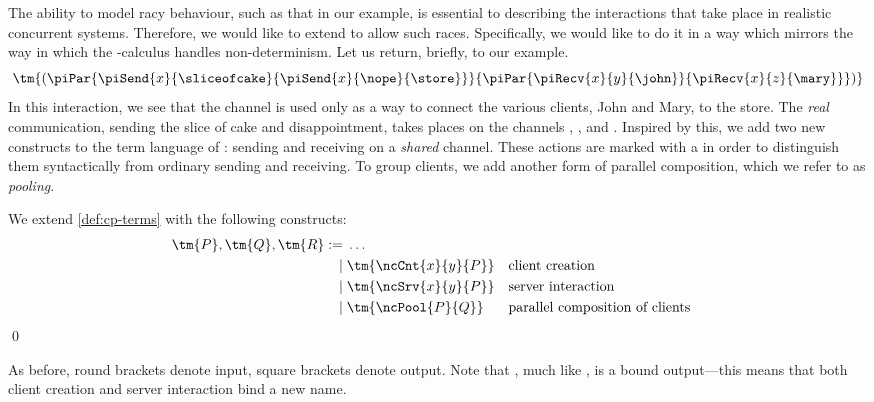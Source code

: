 \documentclass[UKenglish]{llncs}
\begin{document}
The ability to model racy behaviour, such as that in our example, is essential
to describing the interactions that take place in realistic concurrent systems.
Therefore, we would like to extend \cp to allow such races.
Specifically, we would like to do it in a way which mirrors the way in which the
\textpi-calculus handles non-determinism.
Let us return, briefly, to our example.
\[
  \tm{(\piPar{%
      \piSend{x}{\sliceofcake}{\piSend{x}{\nope}{\store}}
    }{%
      \piPar{\piRecv{x}{y}{\john}}{\piRecv{x}{z}{\mary}}
    })}
\]
In this interaction, we see that the channel  is used only as a way to
connect the various clients, John and Mary, to the store.
The \emph{real} communication, sending the slice of cake and disappointment,
takes places on the channels \tm{\sliceofcake}, \tm{\nope},  and .
Inspired by this, we add two new constructs to the term language of \cp: sending
and receiving on a \emph{shared} channel.
These actions are marked with a \tm{\star} in order to distinguish them
syntactically from ordinary sending and receiving.
To group clients, we add another form of parallel composition, which we refer to
as \emph{pooling}.
\begin{definition}[Terms]\label{def:nc-terms}
  We extend \cref{def:cp-terms} with the following constructs:
  \[\!
    \begin{aligned}
      \tm{P}, \tm{Q}, \tm{R}
           :=& \; \dots
      \\ \mid& \; \tm{\ncCnt{x}{y}{P}} &&\text{client creation}
      \\ \mid& \; \tm{\ncSrv{x}{y}{P}} &&\text{server interaction}
      \\ \mid& \; \tm{\ncPool{P}{Q}}   &&\text{parallel composition of clients}
    \end{aligned}
  \]
  \qed
\end{definition}
As before, round brackets denote input, square brackets denote output.
Note that , much like , is a bound
output---this means that both client creation and server interaction bind a new
name.
\end{document}
